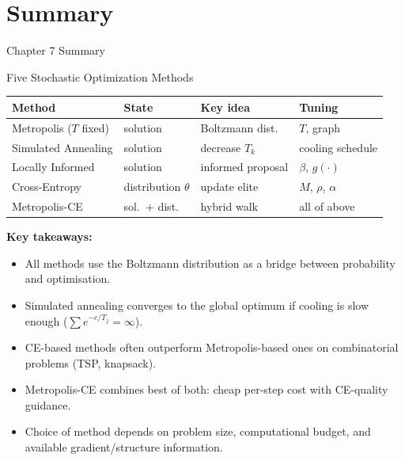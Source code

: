 \documentclass[aspectratio=169,10pt]{beamer}
\begin{document}
\section{Summary}

\begin{frame}{Chapter 7 Summary}
  \begin{block}{Five Stochastic Optimization Methods}
    \small
    \begin{tabular}{llll}
      \toprule
      Method & State & Key idea & Tuning \\
      \midrule
      Metropolis ($T$ fixed) & solution & Boltzmann dist.\ & $T$, graph \\
      Simulated Annealing & solution & decrease $T_k$ & cooling schedule \\
      Locally Informed & solution & informed proposal & $\beta$, $g(\cdot)$ \\
      Cross-Entropy & distribution $\theta$ & update elite & $M$, $\rho$, $\alpha$ \\
      Metropolis-CE & sol.\ + dist.\ & hybrid walk & all of above \\
      \bottomrule
    \end{tabular}
  \end{block}

  \medskip
  \textbf{Key takeaways:}
  \begin{itemize}
    \item All methods use the Boltzmann distribution as a bridge between
      probability and optimisation.
    \item Simulated annealing converges to the global optimum if cooling
      is slow enough ($\sum e^{-c/T_j} = \infty$).
    \item CE-based methods often outperform Metropolis-based ones on
      combinatorial problems (TSP, knapsack).
    \item Metropolis-CE combines best of both: cheap per-step cost with
      CE-quality guidance.
    \item Choice of method depends on problem size, computational budget,
      and available gradient/structure information.
  \end{itemize}
\end{frame}
\end{document}
